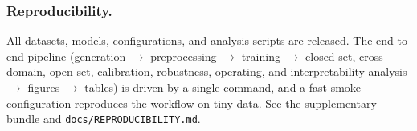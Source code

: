 \documentclass[runningheads]{llncs}
\begin{document}
\subsubsection*{Reproducibility.}
All datasets, models, configurations, and analysis scripts are released. The end-to-end pipeline (generation $\to$ preprocessing $\to$ training $\to$ closed-set, cross-domain, open-set, calibration, robustness, operating, and interpretability analysis $\to$ figures $\to$ tables) is driven by a single command, and a fast smoke configuration reproduces the workflow on tiny data. See the supplementary bundle and \texttt{docs/REPRODUCIBILITY.md}.



\end{document}
